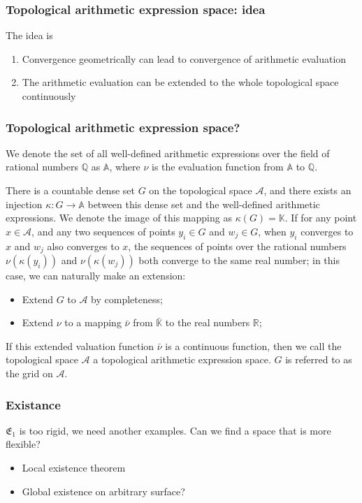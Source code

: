 \documentclass[aspectratio=169]{beamer}
\begin{document}
\begin{frame}
    \frametitle{Topological arithmetic expression space: idea}
    The idea is
    \begin{enumerate}
        \item Convergence geometrically can lead to convergence of arithmetic evaluation
        \item The arithmetic evaluation can be extended to the whole topological space continuously
    \end{enumerate}
\end{frame}

\begin{frame}
    \frametitle{Topological arithmetic expression space?}
    We denote the set of all well-defined arithmetic expressions over the field of rational numbers $\mathbb{Q}$ as $\mathbb{A}$, where $\nu$ is the evaluation function from $\mathbb{A}$ to $\mathbb{Q}$.
    \begin{definition}
        There is a countable dense set $G$ on the topological space $\mathcal{A}$, and there exists an injection $\kappa: G \to \mathbb{A}$ between this dense set and the well-defined arithmetic expressions.
        We denote the image of this mapping as $\kappa(G) = \mathbb{K}$. If for any point $x \in \mathcal{A}$,
        and any two sequences of points $y_i \in G$ and $w_j \in G$, when $y_i$ converges to $x$ and $w_j$ also converges to $x$,
        the sequences of points over the rational numbers $\nu(\kappa(y_i))$ and $\nu(\kappa(w_j))$ both converge to the same real number; in this case, we can naturally make an extension:
        \begin{itemize}
            \item Extend $G$ to $\mathcal{A}$ by completeness;
            \item Extend $\nu$ to a mapping $\bar{\nu}$ from $\bar{\mathbb{K}}$ to the real numbers $\mathbb{R}$;
        \end{itemize}
        If this extended valuation function $\bar{\nu}$ is a continuous function, then we call the topological space $\mathcal{A}$ a topological arithmetic expression space. $G$ is referred to as the grid on $\mathcal{A}$.
    \end{definition}
\end{frame}

\begin{frame}
    \frametitle{Existance}
    $\mathfrak{E_1}$ is too rigid, we need another examples. Can we find a space that is more flexible?
    \begin{itemize}
        \item Local existence theorem
        \item Global existence on arbitrary surface?
    \end{itemize}
\end{frame}
\end{document}

